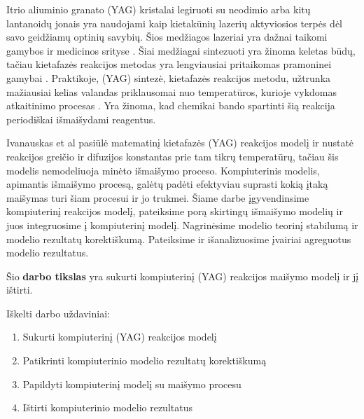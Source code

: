 
Itrio aliuminio granato (YAG) kristalai legiruoti su neodimio arba kitų lantanoidų jonais yra naudojami kaip kietakūnių lazerių aktyviosios terpės dėl savo geidžiamų optinių savybių. Šios medžiagos lazeriai yra dažnai taikomi gamybos ir medicinos srityse \cite{dubeyExperimentalStudyNd2008, valentiUseErYAG2021}. Šiai medžiagai sintezuoti yra žinoma keletas būdų, tačiau kietafazės reakcijos metodas yra lengviausiai pritaikomas pramoninei gamybai \cite{bhattacharyyaMethodsSynthesisY3AI5O122007, zhangNovelSynthesisYAG2005}. Praktikoje, (YAG) sintezė, kietafazės reakcijos metodu, užtrunka mažiausiai kelias valandas priklausomai nuo temperatūros, kurioje vykdomas atkaitinimo procesas \cite{mackeviciusCloserLookComputer2012}. Yra žinoma, kad chemikai bando spartinti šią reakcija periodiškai išmaišydami reagentus.

Ivanauskas et al \cite{ivanauskasModellingSolidState2005} pasiūlė matematinį kietafazės (YAG) reakcijos modelį ir nustatė reakcijos greičio ir difuzijos konstantas prie tam tikrų temperatūrų, tačiau šis modelis nemodeliuoja minėto išmaišymo proceso. Kompiuterinis modelis, apimantis išmaišymo procesą, galėtų padėti efektyviau suprasti kokią įtaką maišymas turi šiam procesui ir jo trukmei. Šiame darbe įgyvendinsime kompiuterinį reakcijos modelį, pateiksime porą skirtingų išmaišymo modelių ir juos integruosime į kompiuterinį modelį. Nagrinėsime modelio teorinį stabilumą ir modelio rezultatų korektiškumą. Pateiksime ir išanalizuosime įvairiai agreguotus modelio rezultatus.

Šio \textbf{darbo tikslas} yra sukurti kompiuterinį (YAG) reakcijos maišymo modelį ir jį ištirti.

Iškelti darbo uždaviniai:

\begin{enumerate}
\item Sukurti kompiuterinį (YAG) reakcijos modelį
\item Patikrinti kompiuterinio modelio rezultatų korektiškumą
\item Papildyti kompiuterinį modelį su maišymo procesu
\item Ištirti kompiuterinio modelio rezultatus
\end{enumerate}